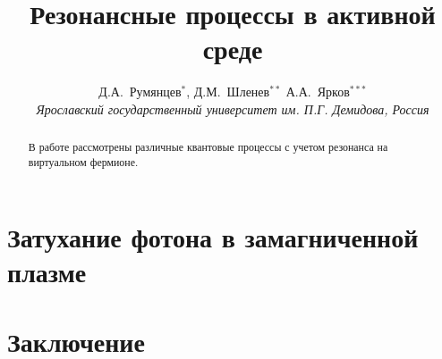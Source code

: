 \documentclass[12pt]{article}
\title{Резонансные процессы в активной среде}
\author{Д.А.~Румянцев$^{*}$, Д.М.~Шленев$^{**}$
А.А.~Ярков$^{***}$
\\
{\it Ярославский государственный университет им. П.Г. Демидова, Россия}}
\date{}
\begin{document}
\large
\maketitle
\def\abstractname{\empty}
\baselineskip=22pt

\begin{abstract}

\baselineskip=20pt

{\large В работе рассмотрены различные квантовые процессы с учетом резонанса на виртуальном фермионе.}
\end{abstract}

{\def\thefootnote{*}
\def\thefootnote{**}
\def\thefootnote{***}
}

\newpage
\unitlength 1mm




\label{Ch:WaveF}
\label{Ch:Propagator}
\label{Ch:Photon}
\label{Ch:Compton}



\section{Затухание фотона в замагниченной плазме}
\label{sec2.1}
\section{Заключение}

\newpage
%


\end{document}
